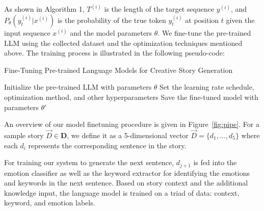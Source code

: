 \documentclass{article} %
\begin{document}
As shown in Algorithm 1, $T^{(i)}$ is the length of the target sequence $y^{(i)}$, and $P_\theta(y_t^{(i)} | x^{(i)})$ is the probability of the true token $y_t^{(i)}$ at position $t$ given the input sequence $x^{(i)}$ and the model parameters $\theta$. We fine-tune the pre-trained LLM using the collected dataset and the optimization techniques mentioned above. The training process is illustrated in the following pseudo-code:

\begin{algorithm}
    \caption{Fine-Tuning Pre-trained Language Models for Creative Story Generation}\label{alg:fine-tuning}
    Initialize the pre-trained LLM with parameters $\theta$\;
    Set the learning rate schedule, optimization method, and other hyperparameters\;
    Save the fine-tuned model with parameters $\theta'$\;
\end{algorithm}

An overview of our model finetuning procedure is given in Figure~\ref{fig:pipe}. For a sample story $\vec{D} \in \mathbf{D}$, we define it as a 5-dimensional vector $\vec{D} = \{d_1, \dots, d_5\}$ where each $d_i$ represents the corresponding sentence in the story. %
%

For training our system to generate the next sentence, $d_{j+1}$ is fed into the emotion classifier as well as the keyword extractor for identifying the emotions and keywords in the next sentence. Based on story context and the additional knowledge input, the language model is trained on a triad of data: context, keyword, and emotion labels. 
\end{document}
